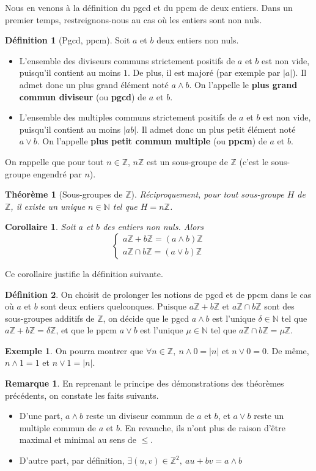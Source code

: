 \documentclass[french]{book}
\newcommand{\N}{\mathbb{N}}
\newcommand{\Z}{\mathbb{Z}}
\theoremstyle{plain}
\newtheorem{thm}{Théorème}[chapter]
\newtheorem{cor}{Corollaire}[chapter]
\theoremstyle{definition}
\newtheorem{dfn}{Définition}[chapter]
\newtheorem{exa}{Exemple}[chapter]
\newtheorem{rmq}{Remarque}[chapter]
\theoremstyle{remark}
\begin{document}
Nous en venons à la définition du pgcd et du ppcm de deux entiers. Dans un premier temps, restreignons-nous au cas où les entiers sont non nuls.
\begin{dfn}[Pgcd, ppcm]
	Soit $a$ et $b$ deux entiers non nuls.
	\begin{itemize}
		\item 
		L'ensemble des diviseurs communs strictement positifs de $a$ et $b$ est non vide, puisqu'il contient au moins $1$. De plus, il est majoré (par exemple par $\lvert a\rvert$). Il admet donc un plus grand élément noté $a\wedge b$. On l'appelle le \textbf{plus grand commun diviseur} (ou \textbf{pgcd}) de $a$ et $b$.
		\item L'ensemble des multiples communs strictement positifs de $a$ et $b$ est non vide, puisqu'il contient au moins $\lvert ab\rvert$. Il admet donc un plus petit élément noté $a\vee b$. On l'appelle \textbf{plus petit commun multiple} (ou \textbf{ppcm}) de $a$ et $b$.
	\end{itemize}
\end{dfn}
On rappelle que pour tout $n\in\Z$, $n\Z$ est un sous-groupe de $\Z$ (c'est le sous-groupe engendré par $n$).
\begin{thm}[Sous-groupes de $\Z$]
	Réciproquement, pour tout sous-groupe $H$ de $\Z$, il existe un unique $n\in\N$ tel que $H=n\Z$.
\end{thm}
\begin{cor}
	Soit $a$ et $b$ des entiers non nuls. Alors $$\left \{\begin{array}{ll}a\Z+b\Z=(a\wedge b)\Z \\ a\Z\cap b\Z=(a\vee b)\Z\end{array}\right.$$
\end{cor}
Ce corollaire justifie la définition suivante.
\begin{dfn}
	On choisit de prolonger les notions de pgcd et de ppcm dans le cas où $a$ et $b$ sont deux entiers quelconques. Puisque $a\Z+b\Z$ et $a\Z\cap b\Z$ sont des sous-groupes additifs de $\Z$, on décide que le pgcd $a\wedge b$ est l'unique $\delta\in\N$ tel que $a\Z+b\Z=\delta\Z$, et que le ppcm $a\vee b$ est l'unique $\mu\in\N$ tel que $a\Z\cap b\Z=\mu\Z$.
\end{dfn}
\begin{exa}
	On pourra montrer que $\forall n \in\Z,\ n\wedge0=\lvert n\rvert$ et $n\vee0=0$. De même, $n\wedge1=1$ et $n\vee1=\lvert n\rvert$.
\end{exa}
\begin{rmq}
	En reprenant le principe des démonstrations des théorèmes précédents, on constate les faits suivants.
	\begin{itemize}
		\item D'une part, $a\wedge b$ reste un diviseur commun de $a$ et $b$, et $a\vee b$ reste un multiple commun de $a$ et $b$. En revanche, ils n'ont plus de raison d'être maximal et minimal au sens de $\leqslant$.
		\item D'autre part, par définition, $\exists(u,v)\in\Z^2,\ au+bv=a\wedge b$
	\end{itemize}
\end{rmq}
\end{document}

